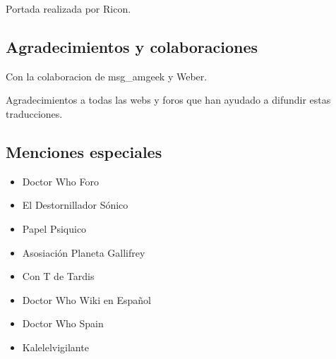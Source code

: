 Portada realizada por Ricon.

\subsection*{Agradecimientos y
colaboraciones}\label{agradecimientos-y-colaboraciones}

Con la colaboracion de msg\_amgeek y Weber.

Agradecimientos a todas las webs y foros que han ayudado a difundir
estas traducciones.

\subsection*{Menciones especiales}\label{menciones-especiales}

\begin{itemize}
\itemsep1pt\parskip0pt
\item
  Doctor Who Foro
\item
  El Destornillador Sónico
\item
  Papel Psiquico
\item
  Asosiación Planeta Gallifrey
\item
  Con T de Tardis
\item
  Doctor Who Wiki en Español
\item
  Doctor Who Spain
\item
  Kalelelvigilante
\end{itemize}
